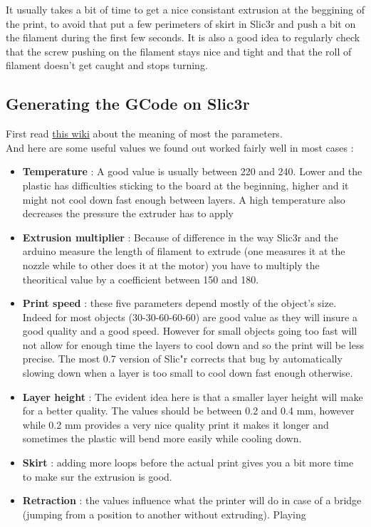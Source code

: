 \documentclass{article}
\begin{document}
It usually takes a bit of time to get a nice consistant extrusion at the beggining of the print, to avoid that put a few perimeters of skirt in Slic3r and push a bit on the filament during the first few seconds.
It is also a good idea to regularly check that the screw pushing on the filament stays nice and tight and that the roll of filament doesn't get caught and stops turning.

\subsection{Generating the GCode on Slic3r}

First read \href{http://richrap.blogspot.com/2012/01/slic3r-is-nicer-part-1-settings-and.html}{this wiki} about the meaning of most the parameters. \\

And here are some useful values we found out worked fairly well in most cases :
\begin{itemize}
\item \textbf{Temperature} : A good value is usually between 220 and 240. Lower and the plastic has difficulties sticking to the board at the beginning, higher and it might not cool down fast enough between layers. A high temperature also decreases the pressure the extruder has to apply
\item \textbf{Extrusion multiplier} : Because of difference in the way Slic3r and the arduino measure the length of filament to extrude (one measures it at the nozzle while to other does it at the motor) you have to multiply the theoritical value by a coefficient between 150 and 180.
\item \textbf{Print speed} : these five parameters depend mostly of the object's size. Indeed for most objects (30-30-60-60-60) are good value as they will insure a good quality and a good speed. However for small objects going too fast will not allow for enough time the layers to cool down and so the print will be less precise. The most 0.7 version of Slic"r corrects that bug by automatically slowing down when a layer is too small to cool down fast enough otherwise.
\item \textbf{Layer height} : The evident idea here is that a smaller layer height will make for a better quality. The values should be between 0.2 and 0.4 mm, however while 0.2 mm provides a very nice quality print it makes it longer and sometimes the plastic will bend more easily while cooling down.
\item \textbf{Skirt} : adding more loops before the actual print gives you a bit more time to make sur the extrusion is good.
\item \textbf{Retraction} : the values influence what the printer will do in case of a bridge (jumping from a position to another without extruding). Playing
\end{itemize}
\end{document}
